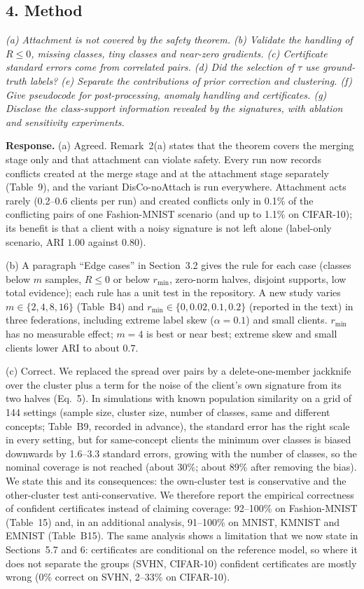 \documentclass[11pt]{article}
\newenvironment{revcomment}{\par\medskip\noindent\begin{minipage}{\linewidth}\color{blue!45!black}\itshape}{\end{minipage}\par\smallskip}
\newcommand{\resp}{\par\noindent\textbf{Response.} }
\begin{document}
\subsection*{4. Method}
\begin{revcomment}
(a) Attachment is not covered by the safety theorem. (b) Validate the handling of $R\le0$, missing classes, tiny classes and near-zero gradients. (c) Certificate standard errors come from correlated pairs. (d) Did the selection of $\tau$ use ground-truth labels? (e) Separate the contributions of prior correction and clustering. (f) Give pseudocode for post-processing, anomaly handling and certificates. (g) Disclose the class-support information revealed by the signatures, with ablation and sensitivity experiments.
\end{revcomment}
\resp
(a) Agreed. Remark~2(a) states that the theorem covers the merging stage only and that attachment can violate safety. Every run now records conflicts created at the merge stage and at the attachment stage separately (Table~9), and the variant DisCo-noAttach is run everywhere. Attachment acts rarely (0.2--0.6 clients per run) and created conflicts only in 0.1\% of the conflicting pairs of one Fashion-MNIST scenario (and up to 1.1\% on CIFAR-10); its benefit is that a client with a noisy signature is not left alone (label-only scenario, ARI $1.00$ against $0.80$).

(b) A paragraph ``Edge cases'' in Section~3.2 gives the rule for each case (classes below $m$ samples, $R\le0$ or below $r_{\min}$, zero-norm halves, disjoint supports, low total evidence); each rule has a unit test in the repository. A new study varies $m\in\{2,4,8,16\}$ (Table~B4) and $r_{\min}\in\{0,0.02,0.1,0.2\}$ (reported in the text) in three federations, including extreme label skew ($\alpha=0.1$) and small clients. $r_{\min}$ has no measurable effect; $m=4$ is best or near best; extreme skew and small clients lower ARI to about $0.7$.

(c) Correct. We replaced the spread over pairs by a delete-one-member jackknife over the cluster plus a term for the noise of the client's own signature from its two halves (Eq.~5). In simulations with known population similarity on a grid of 144 settings (sample size, cluster size, number of classes, same and different concepts; Table~B9, recorded in advance), the standard error has the right scale in every setting, but for same-concept clients the minimum over classes is biased downwards by 1.6--3.3 standard errors, growing with the number of classes, so the nominal coverage is not reached (about 30\%; about 89\% after removing the bias). We state this and its consequences: the own-cluster test is conservative and the other-cluster test anti-conservative. We therefore report the empirical correctness of confident certificates instead of claiming coverage: 92--100\% on Fashion-MNIST (Table~15) and, in an additional analysis, 91--100\% on MNIST, KMNIST and EMNIST (Table~B15). The same analysis shows a limitation that we now state in Sections~5.7 and 6: certificates are conditional on the reference model, so where it does not separate the groups (SVHN, CIFAR-10) confident certificates are mostly wrong (0\% correct on SVHN, 2--33\% on CIFAR-10).
\end{document}
